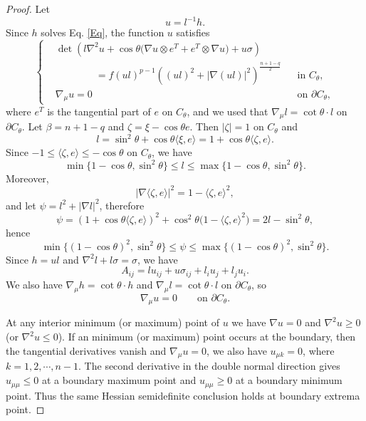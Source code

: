 \documentclass[11pt]{amsart}
\numberwithin{equation} {section}
\numberwithin{equation}{section}
\begin{document}
\begin{proof}
    Let
    \[
        u=l^{-1}h.
    \]
    Since $h$ solves Eq. \eqref{Eq}, the function $u$ satisfies
    \begin{equation}\label{a2}
    \left\{
    \begin{aligned}
    &\det\left(l\nabla^2 u+\cos\theta\bigl(\nabla u\otimes e^T
    +e^T\otimes\nabla u\bigr)+u\sigma\right)\\
    &\qquad\qquad
    =f(ul)^{p-1}\left((ul)^2+|\nabla(ul)|^2\right)^{\frac{n+1-q}{2}}
    &&\text{in }C_{\theta},\\
    &\nabla_{\mu}u=0&&\text{on }\partial C_{\theta},
    \end{aligned}
    \right.
    \end{equation}
    where $e^T$ is the tangential part of $e$ on $C_{\theta}$, and we used that $\nabla_{\mu} l = \cot\theta\cdot l$ on $\partial C_{\theta}$.
    Let $\beta = n+1-q$ and  $\zeta=\xi-\cos\theta e$. Then $|\zeta|=1$ on $C_{\theta}$ and
    \[
        l=\sin^2\theta+\cos\theta\langle\xi,e\rangle
        =1+\cos\theta\langle\zeta,e\rangle.
    \]
    Since $-1\leq\langle\zeta,e\rangle\leq-\cos\theta$ on $C_{\theta}$, we have
    \[
        \min\{1-\cos\theta, \sin^2\theta\}\leq l\leq \max\{1-\cos\theta, \sin^2\theta\}.
    \]
    Moreover,
    \[
        |\nabla\langle\zeta,e\rangle|^2=1-\langle\zeta,e\rangle^2,
    \]
    and let $\psi = l^2 + |\nabla l|^2$, therefore
    \[
        \psi
        =(1+\cos\theta\langle\zeta,e\rangle)^2
        +\cos^2\theta\bigl(1-\langle\zeta,e\rangle^2\bigr)
        =2l-\sin^2\theta,
    \]
    hence
    \[
      \min\{  (1-\cos\theta)^2, \sin^2\theta\} \leq \psi\leq \max\{(1-\cos\theta)^2, \sin^2\theta\}.
    \]
    Since $h=ul$ and $\nabla^2l+l\sigma=\sigma$, we have
    \[
        A_{ij}=l u_{ij}+u\sigma_{ij}+l_i u_j+l_j u_i.
    \]
    We also have $\nabla_{\mu}h=\cot\theta\cdot h$ and $\nabla_{\mu}l=\cot\theta\cdot l$ on
    $\partial C_{\theta}$, so
    \[
        \nabla_{\mu}u=0\qquad\text{on }\partial C_{\theta}.
    \]

    At any interior minimum (or maximum) point of $u$ we have $\nabla u=0$ and $\nabla^2u\geq 0$ (or $\nabla^2 u\leq 0$). If an minimum (or maximum) point occurs at the boundary, then
    the tangential derivatives vanish and $\nabla_{\mu}u=0$, we also have $u_{\mu k} = 0$, where $k=1,2,\cdots, n-1$.
    The second derivative in the double normal direction gives
    $u_{\mu\mu}\leq0$ at a boundary maximum point and $u_{\mu\mu}\geq0$ at a boundary
    minimum point. Thus the same Hessian semidefinite conclusion holds at boundary
    extrema point.


\end{proof}
\end{document}
